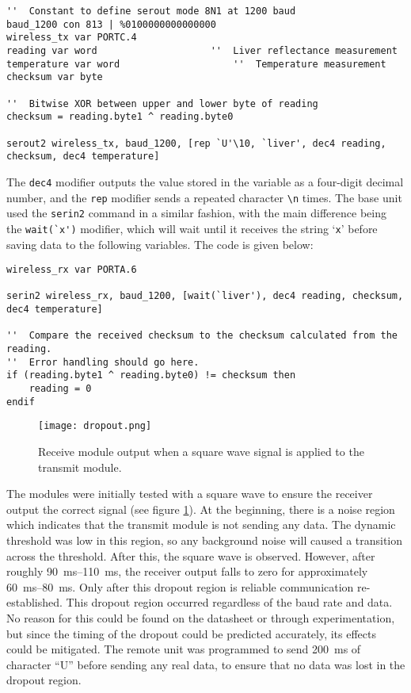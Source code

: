 \begin{lstlisting}
''  Constant to define serout mode 8N1 at 1200 baud
baud_1200 con 813 | %0100000000000000
wireless_tx var PORTC.4
reading var word 					''  Liver reflectance measurement
temperature var word					''  Temperature measurement
checksum var byte

''  Bitwise XOR between upper and lower byte of reading
checksum = reading.byte1 ^ reading.byte0

serout2 wireless_tx, baud_1200, [rep `U'\10, `liver', dec4 reading, checksum, dec4 temperature]
\end{lstlisting}

The \verb|dec4| modifier outputs the value stored in the variable as a four-digit decimal number, and the \verb|rep| modifier sends a repeated character \verb|\n| times. The base unit used the \verb|serin2| command in a similar fashion, with the main difference being the \verb|wait(`x')| modifier, which will wait until it receives the string `\verb|x|' before saving data to the following variables. The code is given below:

\begin{lstlisting}
wireless_rx var PORTA.6

serin2 wireless_rx, baud_1200, [wait(`liver'), dec4 reading, checksum, dec4 temperature]

''  Compare the received checksum to the checksum calculated from the reading. 
''  Error handling should go here.
if (reading.byte1 ^ reading.byte0) != checksum then
    reading = 0
endif
\end{lstlisting}






\begin{figure}[htb]
	\centering
	\texttt{[image: dropout.png]}
	\caption{Receive module output when a square wave signal is applied to the transmit module.}
	\label{fig: dropout}
\end{figure}

The modules were initially tested with a square wave to ensure the receiver output the correct signal (see figure \ref{fig: dropout}). At the beginning, there is a noise region which indicates that the transmit module is not sending any data. The dynamic threshold was low in this region, so any background noise will caused a transition across the threshold. After this, the square wave is observed. However, after roughly \SIrange{90}{110}{\milli\second}, the receiver output falls to zero for approximately \SIrange{60}{80}{\milli\second}. Only after this dropout region is reliable communication re-established. This dropout region occurred regardless of the baud rate and data. No reason for this could be found on the datasheet or through experimentation, but since the timing of the dropout could be predicted accurately, its effects could be mitigated. The remote unit was programmed to send \SI{200}{\milli\second} of character ``U'' before sending any real data, to ensure that no data was lost in the dropout region.\\

